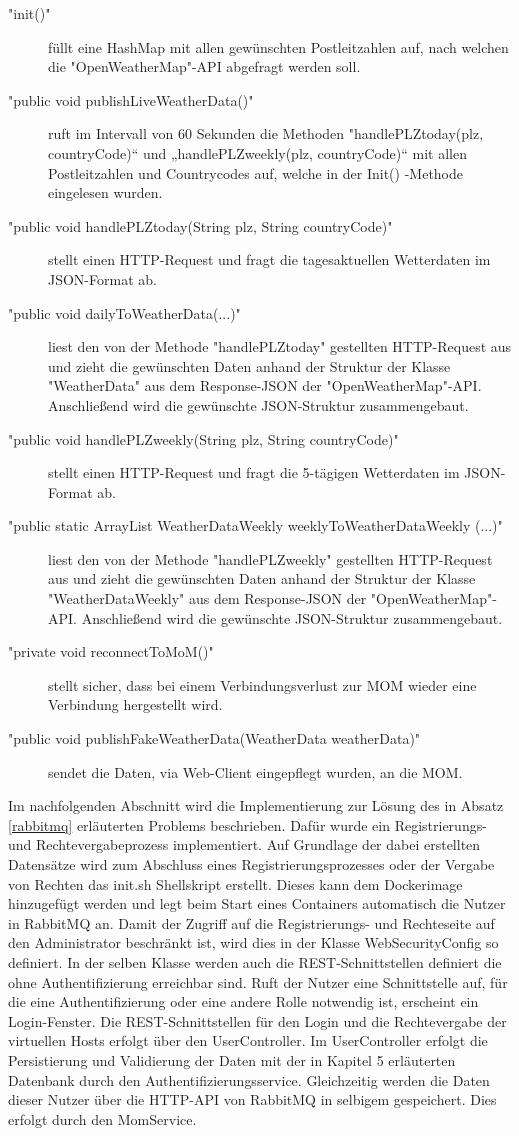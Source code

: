 \begin{description}
\item["init()"] füllt eine HashMap mit allen gewünschten Postleitzahlen auf, nach welchen die "OpenWeatherMap"-API abgefragt werden soll.
\item["public void publishLiveWeatherData()"] ruft im Intervall von 60 Sekunden die Methoden "handlePLZtoday(plz, countryCode)“ und „handlePLZweekly(plz, countryCode)“ mit allen Postleitzahlen und Countrycodes auf, welche in der Init() -Methode eingelesen wurden. 
\item["public void handlePLZtoday(String plz, String countryCode)"] stellt einen HTTP-Request und fragt die tagesaktuellen Wetterdaten im JSON-Format ab.
\item["public void dailyToWeatherData(...)"] liest den von der Methode "handlePLZtoday" gestellten HTTP-Request aus und zieht die gewünschten Daten anhand der Struktur der Klasse "WeatherData" aus dem Response-JSON der "OpenWeatherMap"-API. Anschließend wird  die gewünschte JSON-Struktur zusammengebaut. 
\item["public void handlePLZweekly(String plz, String countryCode)"]stellt einen HTTP-Request und fragt die 5-tägigen Wetterdaten im JSON-Format ab.
\item["public static ArrayList WeatherDataWeekly weeklyToWeatherDataWeekly 
(...)" ]liest den von der Methode "handlePLZweekly" gestellten HTTP-Request aus und zieht die gewünschten Daten anhand der Struktur der Klasse "WeatherDataWeekly" aus dem Response-JSON der "OpenWeatherMap"-API. Anschließend wird die gewünschte JSON-Struktur zusammengebaut.
\item["private void reconnectToMoM()"] stellt sicher, dass bei einem Verbindungsverlust zur MOM wieder eine Verbindung hergestellt wird. 
\item["public void publishFakeWeatherData(WeatherData weatherData)"] sendet die Daten, via Web-Client eingepflegt wurden, an die MOM. 
\end{description}

Im nachfolgenden Abschnitt wird die Implementierung zur Lösung des in Absatz \ref{rabbitmq} erläuterten Problems beschrieben. Dafür wurde ein Registrierungs- und Rechtevergabeprozess implementiert. Auf Grundlage der dabei erstellten Datensätze wird zum Abschluss eines Registrierungsprozesses oder der Vergabe von Rechten das init.sh Shellskript erstellt. Dieses kann dem Dockerimage hinzugefügt werden und legt beim Start eines Containers automatisch die Nutzer in RabbitMQ an.
Damit der Zugriff auf die Registrierungs- und Rechteseite auf den Administrator beschränkt ist, wird dies in der Klasse WebSecurityConfig so definiert. In der selben Klasse werden auch die REST-Schnittstellen definiert die ohne Authentifizierung erreichbar sind. Ruft der Nutzer eine Schnittstelle auf, für die eine Authentifizierung oder eine andere Rolle notwendig ist, erscheint ein Login-Fenster. Die REST-Schnittstellen für den Login und die Rechtevergabe der virtuellen Hosts erfolgt über den UserController. Im UserController erfolgt die Persistierung und Validierung der Daten mit der in Kapitel 5 erläuterten Datenbank durch den Authentifizierungsservice. Gleichzeitig werden die Daten dieser Nutzer über die HTTP-API von RabbitMQ in selbigem gespeichert. Dies erfolgt durch den MomService.
